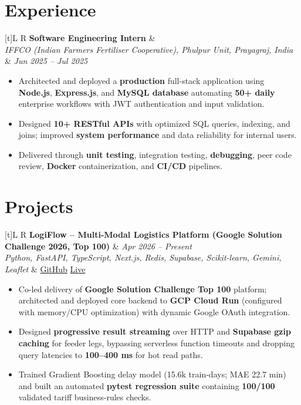 \documentclass[a4paper,10pt]{article}
\newcommand{\resumeSubheading}[4]{
  \vspace{1mm}
  \noindent
  \begin{tabularx}{\textwidth}[t]{L R}
    \textbf{#1} & #4 \\
    \textit{#3} & \textit{#2} \\
  \end{tabularx}
  \vspace{-1mm}
}
\newcommand{\resumeProject}[4]{
  \vspace{1mm}
  \noindent
  \begin{tabularx}{\textwidth}[t]{L R}
    \textbf{#1} & \textit{#3} \\
    \textit{#2} & #4 \\
  \end{tabularx}
  \vspace{-1mm}
}
\begin{document}
\section{Experience}
\small
\resumeSubheading
  {Software Engineering Intern}{Jun 2025 -- Jul 2025}
  {IFFCO (Indian Farmers Fertiliser Cooperative), Phulpur Unit, Prayagraj, India}{}
\begin{itemize}
  \item Architected and deployed a \textbf{production} full-stack application using \textbf{Node.js}, \textbf{Express.js}, and \textbf{MySQL database} automating \textbf{50+ daily} enterprise workflows with JWT authentication and input validation.
  \item Designed \textbf{10+ RESTful APIs} with optimized SQL queries, indexing, and joins; improved \textbf{system performance} and data reliability for internal users.
  \item Delivered through \textbf{unit testing}, integration testing, \textbf{debugging}, peer code review, \textbf{Docker} containerization, and \textbf{CI/CD} pipelines.
\end{itemize}

\section{Projects}
\small

\resumeProject
  {LogiFlow -- Multi-Modal Logistics Platform (Google Solution Challenge 2026, Top 100)}
  {Python, FastAPI, TypeScript, Next.js, Redis, Supabase, Scikit-learn, Gemini, Leaflet}
  {Apr 2026 -- Present}
  {\href{https://github.com/Ojas-Srivastava05/LogiFlow-Solution-Challenge-2026}{GitHub} \textbar{} \href{https://logi-flow-solution-challenge-2026.vercel.app/}{Live}}
\begin{itemize}
  \item Co-led delivery of \textbf{Google Solution Challenge Top 100} platform; architected and deployed core backend to \textbf{GCP Cloud Run} (configured with memory/CPU optimization) with dynamic Google OAuth integration.
  \item Designed \textbf{progressive result streaming} over HTTP and \textbf{Supabase gzip caching} for feeder legs, bypassing serverless function timeouts and dropping query latencies to \textbf{100--400 ms} for hot read paths.
  \item Trained Gradient Boosting delay model (15.6k train-days; MAE 22.7 min) and built an automated \textbf{pytest regression suite} containing \textbf{100/100} validated tariff business-rules checks.
\end{itemize}
\end{document}
